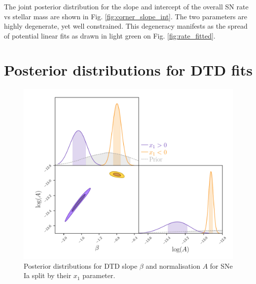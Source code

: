 \documentclass[fleqn,usenatbib]{mnras}
\begin{document}
The joint posterior distribution for the slope and intercept of the overall SN rate vs stellar mass are shown in Fig. \ref{fig:corner_slope_int}. The two parameters are highly degenerate, yet well constrained. This degeneracy manifests as the spread of potential linear fits as drawn in light green on Fig. \ref{fig:rate_fitted}.

\section{Posterior distributions for DTD fits}
\label{appendix:posteriors}


\begin{figure}
    \centering
    \includegraphics[width=.5\textwidth]{figs/fit_dtd_split_x1_A_beta_corner.pdf}
    \caption{Posterior distributions for DTD slope $\beta$ and normalisation $A$ for SNe Ia split by their $x_1$ parameter.%
    \label{fig:corner_beta_norm_split_x1}}
\end{figure}
\end{document}
